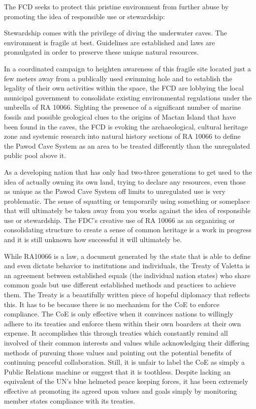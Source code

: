 \documentclass[spanish]{ijsra}
\begin{document}
The FCD seeks to protect this pristine environment from further abuse by promoting the idea of responsible use or stewardship:
\begin{displayquote}
	Stewardship comes with the privilege of diving the underwater caves. The environment is fragile at best. Guidelines are established and laws are promulgated in order to preserve these unique natural resources. %
	\end{displayquote}
	

In a coordinated campaign to heighten awareness of this fragile site located just a few meters away from a publically used swimming hole and to establish the legality of their own activities within the space, the FCD are lobbying the local municipal government to consolidate existing environmental regulations under the umbrella of RA 10066. Sighting the presence of a significant number of marine fossils and possible geological clues to the origins of Mactan Island that have been found in the caves, the FCD is evoking the archaeological, cultural heritage zone and systemic research into natural history sections of RA 10066 to define the Pawod Cave System as an area to be treated differently than the unregulated public pool above it. %

As a developing nation that has only had two-three generations to get used to the idea of actually owning its own land, trying to declare any resources, even those as unique as the Pawod Cave System off limits to unregulated use is very problematic. The sense of squatting or temporarily using something or someplace that will ultimately be taken away from you works against the idea of responsible use or stewardship. The FDC’s creative use of RA 10066 as an organizing or consolidating structure to create a sense of common heritage is a work in progress and it is still unknown how successful it will ultimately be.

While RA10066 is a law, a document generated by the state that is able to define and even dictate behavior to institutions and individuals, the Treaty of Valetta is an agreement between established equals (the individual nation states) who share common goals but use different established methods and practices to achieve them. The Treaty is a beautifully written piece of hopeful diplomacy that reflects this. It has to be because there is no mechanism for the CoE to enforce compliance. The CoE is only effective when it convinces nations to willingly adhere to its treaties and enforce them within their own boarders at their own expense. It accomplishes this through treaties which constantly remind all involved of their common interests and values while acknowledging their differing methods of pursuing those values and pointing out the potential benefits of continuing peaceful collaboration. Still, it is unfair to label the CoE as simply a Public Relations machine or suggest that it is toothless. Despite lacking an equivalent of the UN’s blue helmeted peace keeping forces, it has been extremely effective at promoting its agreed upon values and goals simply by monitoring member states compliance with its treaties.   
\end{document}

